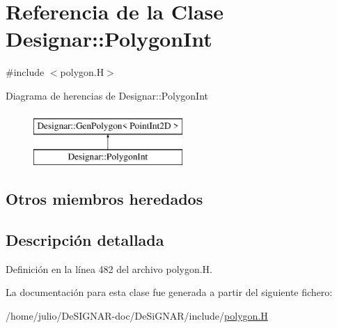\hypertarget{class_designar_1_1_polygon_int}{}\section{Referencia de la Clase Designar\+:\+:Polygon\+Int}
\label{class_designar_1_1_polygon_int}


{\ttfamily \#include $<$polygon.\+H$>$}

Diagrama de herencias de Designar\+:\+:Polygon\+Int\begin{figure}[H]
\begin{center}
\leavevmode
\includegraphics[height=2.000000cm]{class_designar_1_1_polygon_int}
\end{center}
\end{figure}
\subsection*{Otros miembros heredados}


\subsection{Descripción detallada}


Definición en la línea 482 del archivo polygon.\+H.



La documentación para esta clase fue generada a partir del siguiente fichero\+:\begin{DoxyCompactItemize}
\item 
/home/julio/\+De\+S\+I\+G\+N\+A\+R-\/doc/\+De\+Si\+G\+N\+A\+R/include/\hyperlink{polygon_8_h}{polygon.\+H}\end{DoxyCompactItemize}

